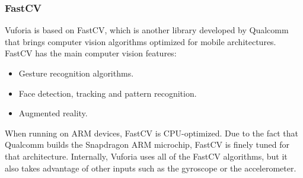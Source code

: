\subsubsection{FastCV}
Vuforia is based on FastCV, which is another library developed by
Qualcomm that brings computer vision algorithms optimized for mobile
architectures. FastCV has the main computer vision features\cite{fastcv}:

\begin{itemize}
\item Gesture recognition algorithms.
\item Face detection, tracking and pattern recognition.
\item Augmented reality.
\end{itemize}

When running on ARM devices, FastCV is CPU-optimized. Due to the fact that Qualcomm
builds the Snapdragon ARM microchip, FastCV is finely tuned for that architecture. 
Internally, Vuforia uses all of the FastCV algorithms, but it also takes advantage
of other inputs such as the gyroscope or the accelerometer.
